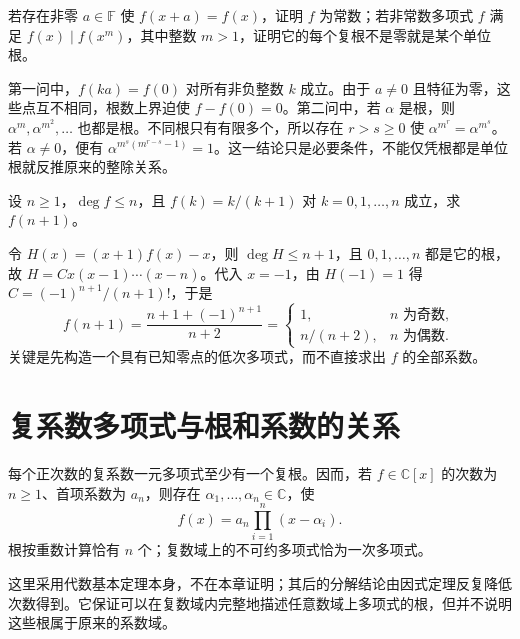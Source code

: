 \begin{example}
\label{ex:poly-finite-roots-applications}
若存在非零 $a\in\mathbb F$ 使 $f(x+a)=f(x)$，证明 $f$ 为常数；若非常数多项式 $f$ 满足 $f(x)\mid f(x^m)$，其中整数 $m>1$，证明它的每个复根不是零就是某个单位根。
\end{example}
\begin{solve}
第一问中，$f(ka)=f(0)$ 对所有非负整数 $k$ 成立。由于 $a\ne0$ 且特征为零，这些点互不相同，根数上界迫使 $f-f(0)=0$。第二问中，若 $\alpha$ 是根，则 $\alpha^m,\alpha^{m^2},\ldots$ 也都是根。不同根只有有限多个，所以存在 $r>s\geq0$ 使 $\alpha^{m^r}=\alpha^{m^s}$。若 $\alpha\ne0$，便有 $\alpha^{m^s(m^{r-s}-1)}=1$。这一结论只是必要条件，不能仅凭根都是单位根就反推原来的整除关系。
\end{solve}

\begin{example}
\label{ex:poly-interpolation-value}
设 $n\geq1$，$\deg f\leq n$，且 $f(k)=k/(k+1)$ 对 $k=0,1,\ldots,n$ 成立，求 $f(n+1)$。
\end{example}
\begin{solve}
令 $H(x)=(x+1)f(x)-x$，则 $\deg H\leq n+1$，且 $0,1,\ldots,n$ 都是它的根，故 $H=Cx(x-1)\cdots(x-n)$。代入 $x=-1$，由 $H(-1)=1$ 得 $C=(-1)^{n+1}/(n+1)!$，于是
\[
    f(n+1)=\frac{n+1+(-1)^{n+1}}{n+2}
    =\begin{cases}1,&n\text{ 为奇数},\\n/(n+2),&n\text{ 为偶数}.\end{cases}
\]
关键是先构造一个具有已知零点的低次多项式，而不直接求出 $f$ 的全部系数。
\end{solve}

\section{复系数多项式与根和系数的关系}
\label{sec:poly-complex}

\begin{theorem}[代数基本定理]
\label{thm:poly-fundamental}
每个正次数的复系数一元多项式至少有一个复根。因而，若 $f\in\mathbb C[x]$ 的次数为 $n\geq1$、首项系数为 $a_n$，则存在 $\alpha_1,\ldots,\alpha_n\in\mathbb C$，使
\[
    f(x)=a_n\prod_{i=1}^n(x-\alpha_i).
\]
根按重数计算恰有 $n$ 个；复数域上的不可约多项式恰为一次多项式。
\end{theorem}

这里采用代数基本定理本身，不在本章证明；其后的分解结论由因式定理反复降低次数得到。它保证可以在复数域内完整地描述任意数域上多项式的根，但并不说明这些根属于原来的系数域。

